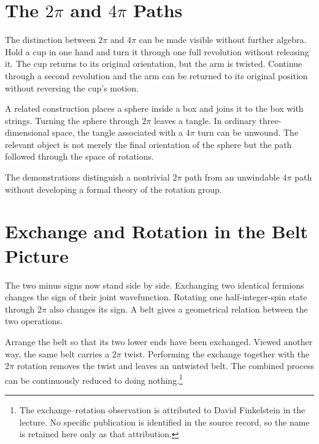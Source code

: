 \section{The \texorpdfstring{\(2\pi\) and \(4\pi\)}{2 pi and 4 pi} Paths}

The distinction between \(2\pi\) and \(4\pi\) can be made visible without further algebra. Hold a cup in one hand and turn it through one full revolution without releasing it. The cup returns to its original orientation, but the arm is twisted. Continue through a second revolution and the arm can be returned to its original position without reversing the cup's motion.

A related construction places a sphere inside a box and joins it to the box with strings. Turning the sphere through \(2\pi\) leaves a tangle. In ordinary three-dimensional space, the tangle associated with a \(4\pi\) turn can be unwound. The relevant object is not merely the final orientation of the sphere but the path followed through the space of rotations.

\begin{classroomqa}
\end{classroomqa}

The demonstrations distinguish a nontrivial \(2\pi\) path from an unwindable \(4\pi\) path without developing a formal theory of the rotation group.

\section{Exchange and Rotation in the Belt Picture}

The two minus signs now stand side by side. Exchanging two identical fermions changes the sign of their joint wavefunction. Rotating one half-integer-spin state through \(2\pi\) also changes its sign. A belt gives a geometrical relation between the two operations.

Arrange the belt so that its two lower ends have been exchanged. Viewed another way, the same belt carries a \(2\pi\) twist. Performing the exchange together with the \(2\pi\) rotation removes the twist and leaves an untwisted belt. The combined process can be continuously reduced to doing nothing.\footnote{The exchange--rotation observation is attributed to David Finkelstein in the lecture. No specific publication is identified in the source record, so the name is retained here only as that attribution.}


